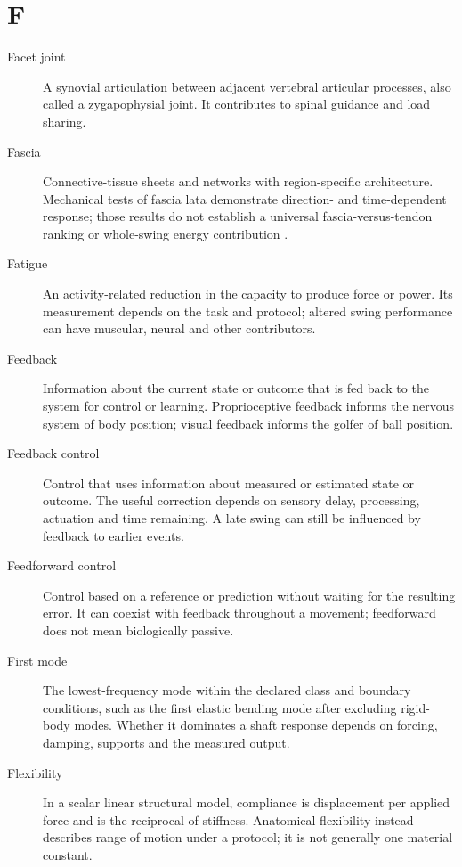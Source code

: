 \section*{F}
\begin{description}

\item[Facet joint] A synovial articulation between adjacent vertebral articular processes, also called a zygapophysial joint. It contributes to spinal guidance and load sharing.

\item[Fascia] Connective-tissue sheets and networks with region-specific architecture. Mechanical tests of fascia lata demonstrate direction- and time-dependent response; those results do not establish a universal fascia-versus-tendon ranking or whole-swing energy contribution \citep{glossaryFascia2023}.

\item[Fatigue] An activity-related reduction in the capacity to produce force or power. Its measurement depends on the task and protocol; altered swing performance can have muscular, neural and other contributors.

\item[Feedback] Information about the current state or outcome that is fed back to the system for control or learning. Proprioceptive feedback informs the nervous system of body position; visual feedback informs the golfer of ball position.

\item[Feedback control] Control that uses information about measured or estimated state or outcome. The useful correction depends on sensory delay, processing, actuation and time remaining. A late swing can still be influenced by feedback to earlier events.

\item[Feedforward control] Control based on a reference or prediction without waiting for the resulting error. It can coexist with feedback throughout a movement; feedforward does not mean biologically passive.

\item[First mode] The lowest-frequency mode within the declared class and boundary conditions, such as the first elastic bending mode after excluding rigid-body modes. Whether it dominates a shaft response depends on forcing, damping, supports and the measured output.

\item[Flexibility] In a scalar linear structural model, compliance is displacement per applied force and is the reciprocal of stiffness. Anatomical flexibility instead describes range of motion under a protocol; it is not generally one material constant.


\end{description}
